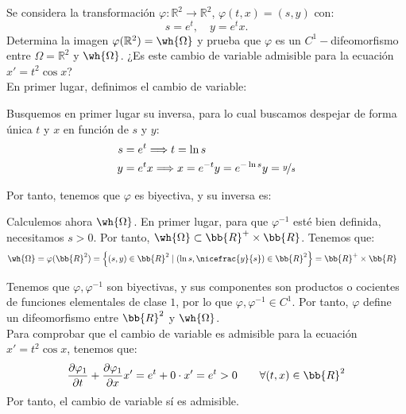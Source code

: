 \documentclass[12pt]{article}
\begin{document}
    \begin{ejercicio}
        Se considera la transformación $\varphi : \mathbb{R}^2 \to \mathbb{R}^2$, $\varphi(t, x) = (s, y)$ con:
        \begin{equation*}
            s = e^t, \quad y = e^{t}x.
        \end{equation*}
        Determina la imagen $\varphi(\mathbb{R}^2) = \wh{\Omega}$ y prueba que $\varphi$ es un $C^1-$difeomorfismo entre $\Omega = \mathbb{R}^2$ y $\wh{\Omega}$. ¿Es este cambio de variable admisible para la ecuación $x' = t^2 \cos x$?\\

        En primer lugar, definimos el cambio de variable:

        Busquemos en primer lugar su inversa, para lo cual buscamos despejar de forma única $t$ y $x$ en función de $s$ y $y$:
        \begin{align*}
            s &= e^t \Longrightarrow t = \ln s\\
            y &= e^{t}x \Longrightarrow x= e^{-t}y = e^{-\ln s}y = \nicefrac{y}{s}
        \end{align*}

        Por tanto, tenemos que $\varphi$ es biyectiva, y su inversa es:

        Calculemos ahora $\wh{\Omega}$. En primer lugar, para que $\varphi^{-1}$ esté bien definida, necesitamos $s>0$. Por tanto, $\wh{\Omega}\subset \bb{R}^+\times \bb{R}$. Tenemos que:
        \begin{align*}
            \wh{\Omega} &= \varphi(\bb{R}^2) = \left\{(s,y)\in \bb{R}^2 \mid \left(\ln s, \nicefrac{y}{s}\right)\in \bb{R}^2\right\} = \bb{R}^+\times \bb{R}
        \end{align*}
        
        Tenemos que $\varphi,\varphi^{-1}$ son biyectivas, y sus componentes son productos o cocientes de funciones elementales de clase $1$, por lo que $\varphi,\varphi^{-1}\in C^1$. Por tanto, $\varphi$ define un difeomorfismo entre $\bb{R}^2$ y $\wh{\Omega}$.\\

        Para comprobar que el cambio de variable es admisible para la ecuación $x'=t^2\cos x$, tenemos que:
        \begin{align*}
            \dfrac{\partial \varphi_1}{\partial t} + \dfrac{\partial \varphi_1}{\partial x}x' 
            = e^t + 0\cdot x' = e^t > 0 \qquad \forall (t,x)\in \bb{R}^2
        \end{align*}
        Por tanto, el cambio de variable sí es admisible.
    \end{ejercicio}
\end{document}
